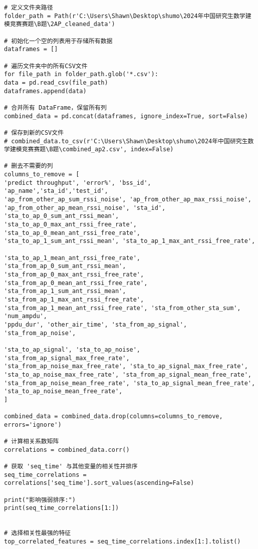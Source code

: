 \documentclass[bwprint,fontset=windows]{gmcmthesis}
\begin{document}
\begin{lstlisting}
# 定义文件夹路径
folder_path = Path(r'C:\Users\Shawn\Desktop\shumo\2024年中国研究生数学建模竞赛赛题\B题\2AP_cleaned_data')

# 初始化一个空的列表用于存储所有数据
dataframes = []

# 遍历文件夹中的所有CSV文件
for file_path in folder_path.glob('*.csv'):
data = pd.read_csv(file_path)
dataframes.append(data)

# 合并所有 DataFrame，保留所有列
combined_data = pd.concat(dataframes, ignore_index=True, sort=False)

# 保存到新的CSV文件
# combined_data.to_csv(r'C:\Users\Shawn\Desktop\shumo\2024年中国研究生数学建模竞赛赛题\B题\combined_ap2.csv', index=False)

# 删去不需要的列
columns_to_remove = [
'predict throughput', 'error%', 'bss_id', 'ap_name','sta_id','test_id',
'ap_from_other_ap_sum_rssi_noise', 'ap_from_other_ap_max_rssi_noise',
'ap_from_other_ap_mean_rssi_noise', 'sta_id', 'sta_to_ap_0_sum_ant_rssi_mean',
'sta_to_ap_0_max_ant_rssi_free_rate', 'sta_to_ap_0_mean_ant_rssi_free_rate',
'sta_to_ap_1_sum_ant_rssi_mean', 'sta_to_ap_1_max_ant_rssi_free_rate',

'sta_to_ap_1_mean_ant_rssi_free_rate', 'sta_from_ap_0_sum_ant_rssi_mean',
'sta_from_ap_0_max_ant_rssi_free_rate', 'sta_from_ap_0_mean_ant_rssi_free_rate',
'sta_from_ap_1_sum_ant_rssi_mean', 'sta_from_ap_1_max_ant_rssi_free_rate',
'sta_from_ap_1_mean_ant_rssi_free_rate', 'sta_from_other_sta_sum', 'num_ampdu',
'ppdu_dur', 'other_air_time', 'sta_from_ap_signal', 'sta_from_ap_noise',

'sta_to_ap_signal', 'sta_to_ap_noise', 'sta_from_ap_signal_max_free_rate',
'sta_from_ap_noise_max_free_rate', 'sta_to_ap_signal_max_free_rate',
'sta_to_ap_noise_max_free_rate', 'sta_from_ap_signal_mean_free_rate',
'sta_from_ap_noise_mean_free_rate', 'sta_to_ap_signal_mean_free_rate',
'sta_to_ap_noise_mean_free_rate',
]

combined_data = combined_data.drop(columns=columns_to_remove, errors='ignore')

# 计算相关系数矩阵
correlations = combined_data.corr()

# 获取 'seq_time' 与其他变量的相关性并排序
seq_time_correlations = correlations['seq_time'].sort_values(ascending=False)

print("影响强弱排序:")
print(seq_time_correlations[1:])


# 选择相关性最强的特征
top_correlated_features = seq_time_correlations.index[1:].tolist()


\end{lstlisting}
\end{document}
